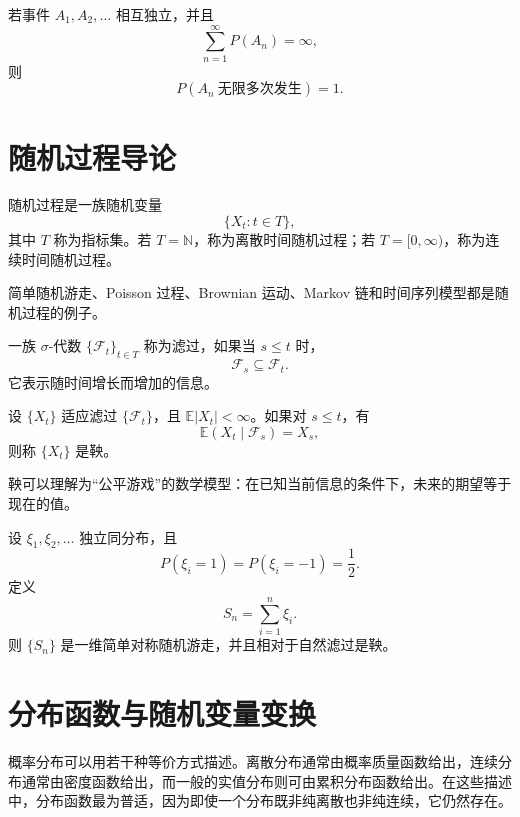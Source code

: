 \begin{theorem}
若事件 $A_1,A_2,\dots$ 相互独立，并且
\[
    \sum_{n=1}^{\infty}P(A_n)=\infty,
\]
则
\[
    P(A_n\ \text{无限多次发生})=1.
\]
\end{theorem}

\section{随机过程导论}

\begin{definition}[随机过程]
随机过程是一族随机变量
\[
    \{X_t:t\in T\},
\]
其中 $T$ 称为指标集。若 $T=\mathbb{N}$，称为离散时间随机过程；若 $T=[0,\infty)$，称为连续时间随机过程。
\end{definition}

\begin{example}
简单随机游走、Poisson 过程、Brownian 运动、Markov 链和时间序列模型都是随机过程的例子。
\end{example}

\begin{definition}[滤过]
一族 $\sigma$-代数 $\{\mathcal{F}_t\}_{t\in T}$ 称为滤过，如果当 $s\le t$ 时，
\[
    \mathcal{F}_s\subseteq\mathcal{F}_t.
\]
它表示随时间增长而增加的信息。
\end{definition}

\begin{definition}[鞅]
设 $\{X_t\}$ 适应滤过 $\{\mathcal{F}_t\}$，且 $\mathbb{E}|X_t|<\infty$。如果对 $s\le t$，有
\[
    \mathbb{E}(X_t\mid\mathcal{F}_s)=X_s,
\]
则称 $\{X_t\}$ 是鞅。
\end{definition}

\begin{remark}
鞅可以理解为“公平游戏”的数学模型：在已知当前信息的条件下，未来的期望等于现在的值。
\end{remark}

\begin{example}[简单随机游走]
设 $\xi_1,\xi_2,\dots$ 独立同分布，且
\[
    P(\xi_i=1)=P(\xi_i=-1)=\frac12.
\]
定义
\[
    S_n=\sum_{i=1}^n \xi_i.
\]
则 $\{S_n\}$ 是一维简单对称随机游走，并且相对于自然滤过是鞅。
\end{example}

\section{分布函数与随机变量变换}

概率分布可以用若干种等价方式描述。离散分布通常由概率质量函数给出，连续分布通常由密度函数给出，而一般的实值分布则可由累积分布函数给出。在这些描述中，分布函数最为普适，因为即使一个分布既非纯离散也非纯连续，它仍然存在。

